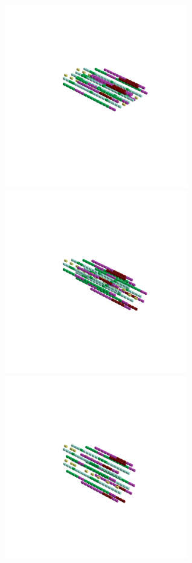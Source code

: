 \clearpage
\hspace{-1cm}
\begin{minipage}[b]{0.50\linewidth}                                       
  \begin{figure}[H]
      \centering
        \vspace*{-1cm}
        \hspace*{-2cm}
        \includegraphics[width=8cm]{src/symmetries/pattern10_1-45.png}%
        \hspace*{-4cm}
        \includegraphics[width=8cm]{src/symmetries/pattern10_2-45.png}\\
        \vspace*{-5cm}
        \hspace*{-3cm}
        \includegraphics[width=8cm]{src/symmetries/pattern10_3-45.png}\\

\end{figure}
\end{minipage}
